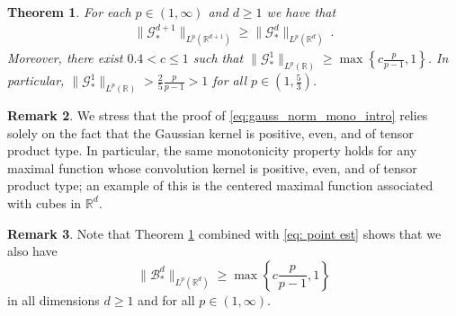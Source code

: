 \documentclass[a4paper, reqno]{amsart}
\newtheorem{thm}{Theorem}[section]
\theoremstyle{definition}
\newtheorem{remark}[thm]{Remark}
\newcommand{\mG}{\mathcal{G}}
\newcommand{\mB}{\mathcal{B}}
\begin{document}
\begin{thm}
    \label{propo:GausMonotonicity}
    For each $p\in(1,\infty)$ and $d\geq 1$ we have that
    \begin{align}\label{eq:gauss_norm_mono_intro}
        \|\mG_\ast^{d+1}\|_{L^p(\mathbb{R}^{d+1})}\geq \|\mG_\ast^{d}\|_{L^p(\mathbb{R}^{d})}~.
    \end{align}
    Moreover, there exist $0.4 <c\leq 1$ such that $\|\mG_\ast^{1}\|_{L^p(\mathbb{R})}\geq \max \left\lbrace c \frac{p}{p-1} , 1 \right\rbrace $.  In particular, $\|\mG_\ast^{1}\|_{L^p(\mathbb{R})}> \frac{2}{5} \frac{p}{p-1}>1$ for all $p\in (1,\frac{5}{3})$.
\end{thm}
\begin{remark}
\label{rem: TensMax}
We stress that the proof of \eqref{eq:gauss_norm_mono_intro} relies solely on the fact that the Gaussian kernel is positive, even, and of tensor product type.
In particular, the same monotonicity property holds for any maximal function whose convolution kernel is positive, even, and of tensor product type; an example of this is the centered maximal function associated with cubes in $\mathbb{R}^d$.
\end{remark}
\begin{remark}
\label{rem: LowHL}
Note that Theorem \ref{propo:GausMonotonicity} combined with \eqref{eq: point est} shows that we also have
\[\|\mB_\ast^{d}\|_{L^p(\mathbb{R}^{d})}\ge  \max \left\lbrace c \frac{p}{p-1} , 1 \right\rbrace\]
in all dimensions $d\ge 1$ and for all $p\in (1,\infty).$
\end{remark}
\end{document}
